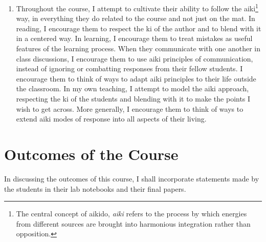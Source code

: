 \begin{enumerate}
\item Throughout the course, I attempt to cultivate their ability to follow the aiki\footnote{The central concept of aikido, \emph{aiki} refers to the process by which energies from different sources are brought into harmonious integration rather than opposition.} way, in everything they do related to the course and not just on the mat. In reading, I encourage them to respect the ki of the author and to blend with it in a centered way. In learning, I encourage them to treat mistakes as useful features of the learning process. When they communicate with one another in class discussions, I encourage them to use aiki principles of communication, instead of ignoring or combatting responses from their fellow students. I encourage them to think of ways to adapt aiki principles to their life outside the classroom. In my own teaching, I attempt to model the aiki approach, respecting the ki of the students and blending with it to make the points I wish to get across. More generally, I encourage them to think of ways to extend aiki modes of response into all aspects of their living.
\end{enumerate}

\section*{Outcomes of the Course}

In discussing the outcomes of this course, I shall incorporate statements made by the students in their lab notebooks and their final papers. 


